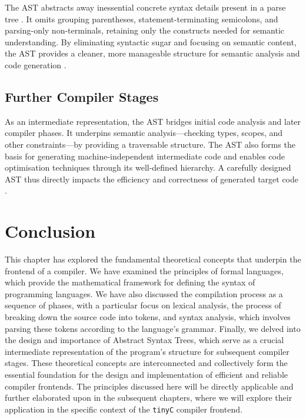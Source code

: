 The AST abstracts away inessential concrete syntax details present in a parse tree \cite{aho2007compilers}. It omits grouping parentheses, statement-terminating semicolons, and parsing-only non-terminals, retaining only the constructs needed for semantic understanding. By eliminating syntactic sugar and focusing on semantic content, the AST provides a cleaner, more manageable structure for semantic analysis and code generation \cite{aho2007compilers}.

\subsection{Further Compiler Stages}

As an intermediate representation, the AST bridges initial code analysis and later compiler phases. It underpins semantic analysis—checking types, scopes, and other constraints—by providing a traversable structure. The AST also forms the basis for generating machine-independent intermediate code and enables code optimisation techniques through its well-defined hierarchy. A carefully designed AST thus directly impacts the efficiency and correctness of generated target code \cite{aho2007compilers}.

\section{Conclusion}

This chapter has explored the fundamental theoretical concepts that underpin the frontend of a compiler. We have examined the principles of formal languages, which provide the mathematical framework for defining the syntax of programming languages. We have also discussed the compilation process as a sequence of phases, with a particular focus on lexical analysis, the process of breaking down the source code into tokens, and syntax analysis, which involves parsing these tokens according to the language's grammar. Finally, we delved into the design and importance of Abstract Syntax Trees, which serve as a crucial intermediate representation of the program's structure for subsequent compiler stages. These theoretical concepts are interconnected and collectively form the essential foundation for the design and implementation of efficient and reliable compiler frontends. The principles discussed here will be directly applicable and further elaborated upon in the subsequent chapters, where we will explore their application in the specific context of the \texttt{tinyC} compiler frontend.